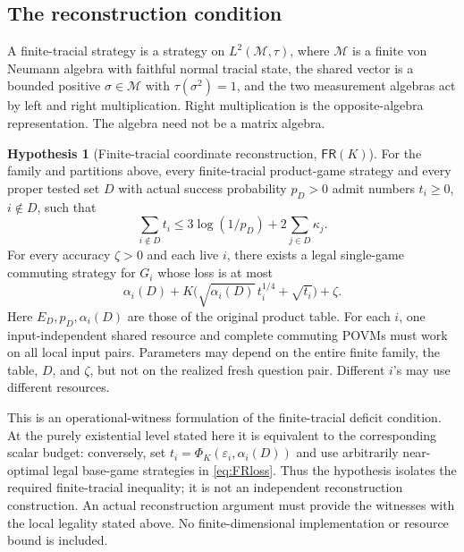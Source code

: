 \documentclass[11pt,reqno]{amsart}
\numberwithin{equation}{section}
\theoremstyle{definition}
\newtheorem{hypothesis}[theorem]{Hypothesis}
\theoremstyle{remark}
\newcommand{\eps}{\varepsilon}
\newcommand{\PhiK}{\Phi_K}
\newcommand{\FR}{\mathsf{FR}}
\begin{document}
\subsection{The reconstruction condition}
A finite-tracial strategy is a strategy on \(L^2(\mathcal M,\tau)\), where \(\mathcal M\) is a finite von Neumann algebra with faithful normal tracial state, the shared vector is a bounded positive \(\sigma\in\mathcal M\) with \(\tau(\sigma^2)=1\), and the two measurement algebras act by left and right multiplication. Right multiplication is the opposite-algebra representation. The algebra need not be a matrix algebra.

\begin{hypothesis}[Finite-tracial coordinate reconstruction, \(\FR(K)\)]\label{hyp:FR}
For the family and partitions above, every finite-tracial product-game strategy and every proper tested set \(D\) with actual success probability \(p_D>0\) admit numbers \(t_i\ge0\), \(i\notin D\), such that
\begin{equation}\label{eq:FRbudget}
 \sum_{i\notin D}t_i\le
 3\log(1/p_D)+2\sum_{j\in D}\kappa_j.
\end{equation}
For every accuracy \(\zeta>0\) and each live \(i\), there exists a legal single-game commuting strategy for \(G_i\) whose loss is at most
\begin{equation}\label{eq:FRloss}
 \alpha_i(D)+K\bigl(\sqrt{\alpha_i(D)}\,t_i^{1/4}
                       +\sqrt{t_i}\bigr)+\zeta.
\end{equation}
Here \(E_D,p_D,\alpha_i(D)\) are those of the original product table. For each \(i\), one input-independent shared resource and complete commuting POVMs must work on all local input pairs. Parameters may depend on the entire finite family, the table, \(D\), and \(\zeta\), but not on the realized fresh question pair. Different \(i\)'s may use different resources.
\end{hypothesis}

This is an operational-witness formulation of the finite-tracial deficit condition. At the purely existential level stated here it is equivalent to the corresponding scalar budget: conversely, set \(t_i=\PhiK(\eps_i,\alpha_i(D))\) and use arbitrarily near-optimal legal base-game strategies in \eqref{eq:FRloss}. Thus the hypothesis isolates the required finite-tracial inequality; it is not an independent reconstruction construction. An actual reconstruction argument must provide the witnesses with the local legality stated above. No finite-dimensional implementation or resource bound is included.
\end{document}
